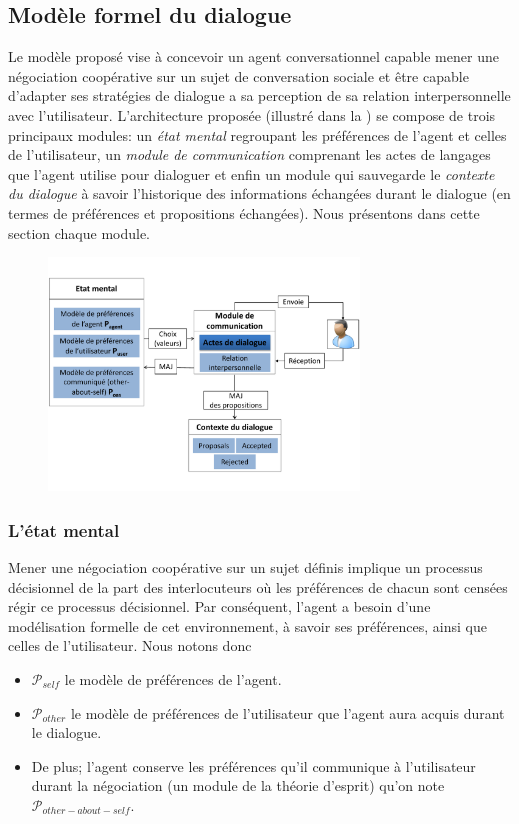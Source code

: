 \documentclass [french]{sig-alternate-05-2015}
\begin{document}
\subsection{Modèle formel du dialogue}
\par Le modèle proposé vise à concevoir un agent conversationnel capable mener une négociation coopérative sur un sujet de conversation sociale et être capable d'adapter ses stratégies de dialogue a sa perception de sa relation interpersonnelle avec l'utilisateur. L'architecture proposée (illustré dans
 la ) se compose de trois principaux modules: un \textit{état mental} regroupant les préférences de l'agent et celles de l'utilisateur, un \textit{module de communication} comprenant les actes de langages que l'agent utilise pour dialoguer et enfin un module qui sauvegarde le \textit{contexte du dialogue} à savoir l'historique des informations échangées durant le dialogue (en termes de préférences et propositions échangées). Nous présentons dans cette section chaque module.
\begin{figure}
	\centerline{\includegraphics [width=3.25in]{figs/modele.pdf}}
\end{figure}

\subsubsection{L'état mental}
\par Mener une négociation coopérative sur un sujet définis implique un processus décisionnel de la part des interlocuteurs  où les préférences de chacun sont censées régir ce processus décisionnel. Par conséquent, l'agent a besoin d'une modélisation formelle de cet environnement, à savoir ses préférences, ainsi que celles de l'utilisateur. Nous notons donc
 \begin{itemize}
 	\item  $\mathcal{P}_{self}$ le modèle de préférences de l'agent.
 	\item $\mathcal{P}_{other}$ le modèle de préférences de l'utilisateur que l'agent aura acquis durant le dialogue.
 	\item De plus; l'agent conserve les préférences qu'il communique à l'utilisateur durant la négociation (un module de la théorie d'esprit) qu'on note $\mathcal{P}_{other-about-self}$.
 \end{itemize}
\end{document}
